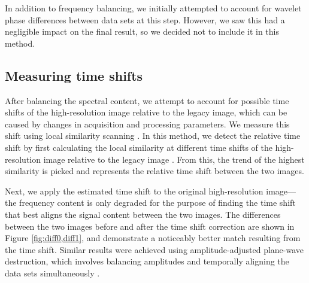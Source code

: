     In addition to frequency balancing, we initially attempted to account for wavelet phase differences between data sets at this step. 
    However, we saw this had a negligible impact on the final result, so we decided not to include it in this method.
    

\subsection{Measuring time shifts}

    After balancing the spectral content, we attempt to account for possible time shifts of the high-resolution image relative to the legacy image, which can be caused by changes in acquisition and processing parameters. 
    We measure this shift using local similarity scanning \cite[]{attr, timelapse}. 
    In this method, we detect the relative time shift by first calculating the local similarity at different time shifts of the high-resolution image relative to the legacy image \cite[]{timelapse}. 
    From this, the trend of the highest similarity is picked and represents the relative time shift between the two images.
    
    Next, we apply the estimated time shift to the original high-resolution image---the frequency content is only degraded for the purpose of finding the time shift that best aligns the signal content between the two images.
    The differences between the two images before and after the time shift correction are shown in Figure \ref{fig:diff0,diff1}, and demonstrate a noticeably better match resulting from the time shift. 
    Similar results were achieved using amplitude-adjusted plane-wave destruction, which involves balancing amplitudes and temporally aligning the data sets simultaneously \cite[]{apwd}.


